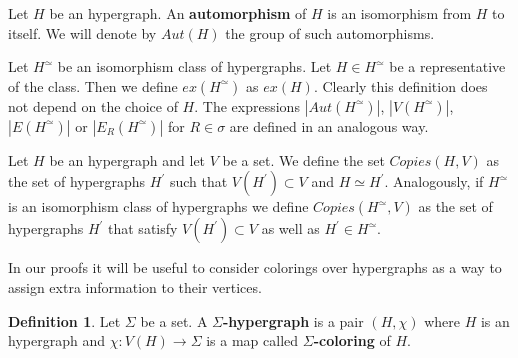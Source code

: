 \documentclass[12pt,notitlepage,a4paper]{article}
\theoremstyle{definition}
\newtheorem{definition}{Definition}[section]
\begin{document}
Let $H$ be an hypergraph. An \textbf{automorphism} of $H$
is an isomorphism from $H$ to itself. We will denote by
$Aut(H)$ the group of such automorphisms. \par

Let $H^\simeq$ be an isomorphism class of hypergraphs. Let
$H\in H^\simeq$ be a representative of the class. 
Then we define $ex(H^\simeq)$ as $ex(H)$. Clearly this definition
does not depend on the choice of $H$. The expressions
$|Aut(H^\simeq)|$,
$|V(H^\simeq)|$, $|E(H^\simeq)|$ or
$|E_R(H^\simeq)|$ for $R\in \sigma$ are defined 
in an analogous way.\par 

Let $H$ be an hypergraph and let $V$ be a set. We define the
set $Copies(H,V)$ as the set of hypergraphs $H^\prime$ such that
$V(H^\prime)\subset V$ and $H\simeq H^\prime$. Analogously, if
$H^\simeq$ is an isomorphism class of hypergraphs we define
$Copies(H^\simeq,V)$ as the set of hypergraphs $H^\prime$ 
that satisfy
$V(H^\prime)\subset V$ as well as $H^\prime \in H^\simeq$.   \par

In our proofs it will be useful to consider colorings over 
hypergraphs as a way to assign extra information to their 
vertices. 

\begin{definition}
	Let $\Sigma$ be a set. A \textbf{$\Sigma$-hypergraph}
	is a pair $(H, \chi)$ where $H$ is an hypergraph
	and $\chi: V(H)\rightarrow \Sigma$ is a map 
	called \textbf{$\Sigma$-coloring} of $H$.
\end{definition}
\end{document}
